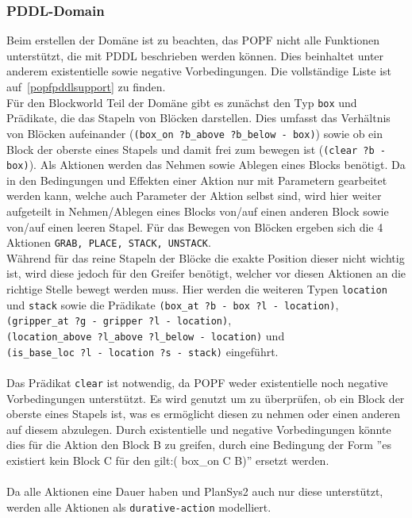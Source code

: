 \subsubsection{PDDL-Domain}
Beim erstellen der Domäne ist zu beachten, das \ac{POPF} nicht alle Funktionen unterstützt, die mit PDDL beschrieben werden können.
Dies beinhaltet unter anderem existentielle sowie negative Vorbedingungen.
Die vollständige Liste ist auf~\ref{popfpddlsupport} zu finden.\\
Für den Blockworld Teil der Domäne gibt es zunächst den Typ \verb|box| und Prädikate, die das Stapeln von Blöcken darstellen.
Dies umfasst das Verhältnis von Blöcken aufeinander (\verb|(box_on ?b_above ?b_below - box)|) sowie ob ein Block der oberste eines Stapels und damit frei zum bewegen ist (\verb|(clear ?b - box)|).
Als Aktionen werden das Nehmen sowie Ablegen eines Blocks benötigt.
Da in den Bedingungen und Effekten einer Aktion nur mit Parametern gearbeitet werden kann, welche auch Parameter der Aktion selbst sind, wird hier weiter aufgeteilt in Nehmen/Ablegen eines Blocks von/auf einen anderen Block sowie von/auf einen leeren Stapel.
Für das Bewegen von Blöcken ergeben sich die 4 Aktionen \verb|GRAB, PLACE, STACK, UNSTACK|.\\
Während für das reine Stapeln der Blöcke die exakte Position dieser nicht wichtig ist, wird diese jedoch für den Greifer benötigt, welcher vor diesen Aktionen an die richtige Stelle bewegt werden muss.
Hier werden die weiteren Typen \verb|location| und \verb|stack| sowie die Prädikate \verb|(box_at ?b - box ?l - location)|,\\ \verb|(gripper_at ?g - gripper ?l - location)|,\\ \verb|(location_above ?l_above ?l_below - location)| und\\ \verb|(is_base_loc ?l - location ?s - stack)| eingeführt.\\ \\
Das Prädikat \verb|clear| ist notwendig, da \ac{POPF} weder existentielle noch negative Vorbedingungen unterstützt.
Es wird genutzt um zu überprüfen, ob ein Block der oberste eines Stapels ist, was es ermöglicht diesen zu nehmen oder einen anderen auf diesem abzulegen.
Durch existentielle und negative Vorbedingungen könnte dies für die Aktion den Block B zu greifen, durch eine Bedingung der Form ''es existiert kein Block C für den gilt:( box\_on C B)'' ersetzt werden. \\ \\
Da alle Aktionen eine Dauer haben und \ac{PlanSys2} auch nur diese unterstützt, werden alle Aktionen als \verb|durative-action| modelliert.
